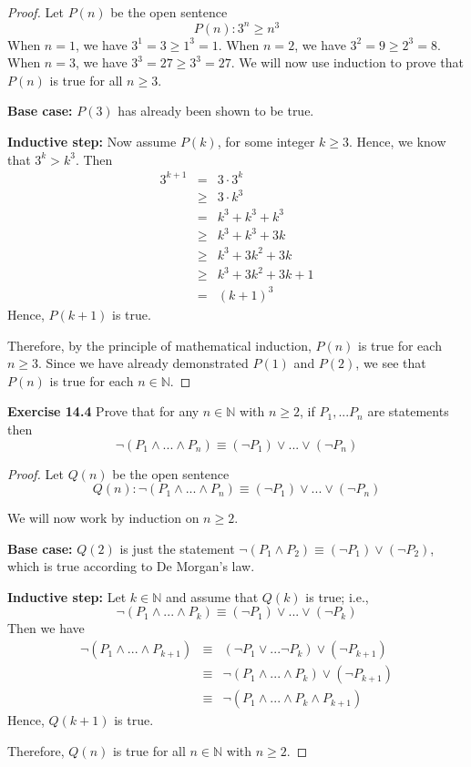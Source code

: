 \documentclass[12pt,oneside]{article}
\newenvironment{exercise}[1]{\vspace{.1in}\noindent\textbf{Exercise #1 \hspace{.05em}}}{}
\newcommand{\N}{\mathbb{N}}
\begin{document}
\begin{proof}
Let $P(n)$ be the open sentence
\[P(n): 3^n \geq n^3\]
When $n = 1$, we have $3^1=3\geq1^3 = 1$. When $n = 2$, we have $3^2 = 9 \geq 2^3 = 8$. When $n = 3$, we have $3^3 = 27 \geq 3^3 = 27$. We will now use induction to prove that $P(n)$ is true for all $n \geq 3$.

\textbf{Base case:} $P(3)$ has already been shown to be true.

\textbf{Inductive step:} Now assume $P(k)$, for some integer $k \geq 3$. Hence, we know that $3^k > k^3$. Then
\begin{eqnarray*}
3^{k+1} &=& 3\cdot3^k \\
&\geq& 3 \cdot k^3 \\
&=& k^3 + k^3 + k^3 \\
&\geq& k^3 + k^3 + 3k \\
&\geq& k^3 + 3k^2 + 3k \\ 
&\geq& k^3 + 3k^2 + 3k + 1\\ 
&=& (k+1)^3
\end{eqnarray*}
Hence, $P(k+1)$ is true.

Therefore, by the principle of mathematical induction, $P(n)$ is true for each $n \geq 3$. Since we have already demonstrated $P(1)$ and $P(2)$, we see that $P(n)$ is true for each $n \in \N$.
\end{proof}



\begin{exercise}{14.4}
Prove that for any $n \in \N$ with $n \geq 2$, if $P_1,...P_n$ are statements then
\[\lnot(P_1 \land ... \land P_n) \equiv (\lnot P_1) \lor ... \lor (\lnot P_n)\]
\end{exercise}

\begin{proof}
Let $Q(n)$ be the open sentence
\[Q(n): \lnot(P_1 \land ... \land P_n) \equiv (\lnot P_1) \lor ... \lor (\lnot P_n)\]

We will now work by induction on $n \geq 2$.

\textbf{Base case:} $Q(2)$ is just the statement $\lnot(P_1 \land P_2) \equiv (\lnot P_1) \lor (\lnot P_2)$, which is true according to De Morgan's law.

\textbf{Inductive step:} Let $k \in \N$ and assume that $Q(k)$ is true; i.e.,
\[\lnot(P_1 \land ... \land P_k) \equiv (\lnot P_1) \lor ... \lor (\lnot P_k)\]
Then we have
\begin{eqnarray*}
\lnot(P_1 \land ... \land P_{k+1}) &\equiv& (\lnot P_1 \lor ... \lnot P_k) \lor (\lnot P_{k+1}) \\
&\equiv& \lnot(P_1 \land ... \land P_k) \lor (\lnot P_{k+1}) \\
&\equiv& \lnot(P_1 \land ... \land P_k \land P_{k+1})
\end{eqnarray*}
Hence, $Q(k+1)$ is true.

Therefore, $Q(n)$ is true for all $n \in \N$ with $n \geq 2$.
\end{proof}
\end{document}
